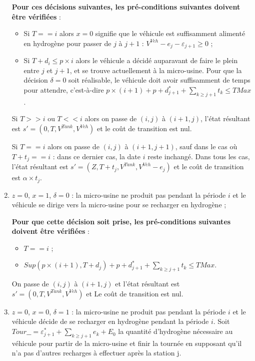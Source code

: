 \begin{enumerate}
	\textbf{Pour ces décisions suivantes, les pré-conditions suivantes doivent être vérifiées} :
	\begin{itemize}[label=$\square$]
		\item Si $T==i$ alors $x=0$ signifie que le véhicule est suffisamment alimenté en hydrogène pour passer de $j$ à $j + 1$ : $V^{Veh}-e_j-\varepsilon_{j+1} \geq 0$ ;
		\item Si $T+d_i\leq p \times i$ alors le véhicule a décidé auparavant de faire le plein entre $j$ et $j + 1$, et se trouve actuellement à la micro-usine. Pour que la décision $\delta= 0$ soit réalisable, le véhicule doit avoir suffisamment de temps pour attendre, c'est-à-dire $p \times (i+1) +p+d^*_{j+1} + \sum_{k\geq j+1}t_k \leq TMax$.
	\end{itemize}
	
	Si $T>>i$ ou $T<<i$ alors on passe de $(i,j)$ à $(i+1,j)$, l'état résultant est $s'=(0,T, V^{Tank},V^{Veh})$ et le coût de transition est nul.
	
	Si $T==i$ alors on passe de $(i,j)$ à $(i+1,j+1)$, sauf dans le cas où $T + t_j == i $ : dans ce dernier cas, la date $i$ reste inchangé. Dans tous les cas, l'état résultant est $s' = (Z, T + t_j, V^{Tank}, V^{Veh} - e_j) $ et le coût de transition est $\alpha \times t_j$.
	
	\item $z=0$, $x=1$, $\delta=0$ : la micro-usine ne produit pas pendant la période $i$ et le véhicule se dirige vers la micro-usine pour se recharger en hydrogène ;
	
	\textbf{Pour que cette décision soit prise, les pré-conditions suivantes doivent être vérifiées} :
	\begin{itemize}[label=$\square$]
		\item $T==i$ ;
		\item $Sup(p \times (i+1),T+d_j) +p+d^*_{j+1} + \sum_{k\geq j+1}t_k \leq TMax$.
	\end{itemize}
	On passe de $(i, j)$ à $(i + 1, j)$ et l'état résultant est $s'= (0, T, V^{Tank}, V^{Veh})$ et Le coût de transition est nul.
	
	\item $z=0$, $x=0$, $\delta=1$ : la micro-usine ne produit pas pendant la période $i$ et le véhicule décide de se recharger en hydrogène pendant la période $i$. Soit $Tour\_\_ = \varepsilon^*_{j + 1} +\sum_{ k \geq j + 1} e_k + E_0$ la quantité d'hydrogène nécessaire au véhicule pour partir de la micro-usine et finir la tournée en supposant qu'il n'a pas d'autres recharges à effectuer après la station j.
	

\end{enumerate}
